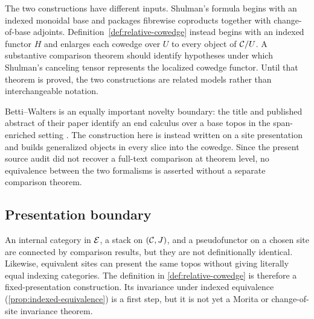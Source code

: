 The two constructions have different inputs.  Shulman's formula begins with
an indexed monoidal base and packages fibrewise coproducts together with
change-of-base adjoints.  Definition~\ref{def:relative-cowedge} instead begins
with an indexed functor \(H\) and enlarges each cowedge over \(U\) to every
object of \(\mathcal{C}/U\).  A substantive comparison theorem should identify
hypotheses under which Shulman's canceling tensor represents the localized
cowedge functor.  Until that theorem is proved, the two constructions are
related models rather than interchangeable notation.

Betti--Walters is an equally important novelty boundary: the title and
published abstract of their paper identify an end calculus over a base topos
in the span-enriched setting \cite{BettiWalters1989}.  The construction here
is instead written on a site presentation and builds generalized objects in
every slice into the cowedge.  Since the present source audit did not recover
a full-text comparison at theorem level, no equivalence between the two
formalisms is asserted without a separate comparison theorem.

\subsection{Presentation boundary}

An internal category in \(\mathcal{E}\), a stack on \((\mathcal{C},J)\), and a pseudofunctor
on a chosen site are connected by comparison results, but they are not
definitionally identical.  Likewise, equivalent sites can present the same
topos without giving literally equal indexing categories.  The definition in
\cref{def:relative-cowedge} is therefore a fixed-presentation construction.
Its invariance under indexed equivalence
(\cref{prop:indexed-equivalence}) is a first step, but it is not yet a Morita
or change-of-site invariance theorem.
